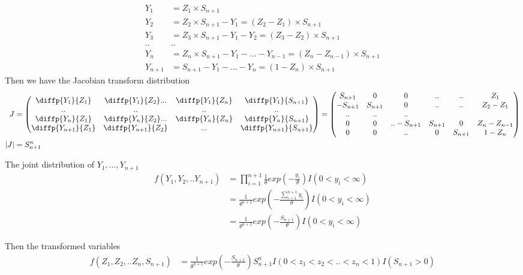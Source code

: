 \documentclass[11pt]{article} %
\begin{document}
\begin{align*}
	Y_1 &= Z_1 \times S_{n+1} \\
	Y_2 &= Z_2 \times S_{n+1} - Y_1 = (Z_2  - Z_1) \times S_{n+1}\\
	Y_3 &= Z_3 \times S_{n+1} - Y_1 - Y_2 = (Z_3  - Z_2) \times S_{n+1}\\
	.. & ..\\
	Y_n &= Z_n \times S_{n+1} - Y_1 - ...- Y_{n-1} = (Z_n  - Z_{n-1}) \times S_{n+1}\\
	Y_{n+1} &= S_{n+1} - Y_1 - ...- Y_{n} = (1- Z_n)  \times S_{n+1}
\end{align*}
Then we have the Jacobian transform distribution
\begin{align*}
	J &= \begin{pmatrix}
		\diffp{Y_1}{{Z_1}} & \diffp{Y_1}{{Z_2}} ... & \diffp{Y_1}{{Z_n}} & \diffp{Y_1}{{S_{n+1}}}\\
		..& ..& ..& ..\\
		\diffp{Y_n}{{Z_1}} & \diffp{Y_n}{{Z_2}}  ... & \diffp{Y_n}{{Z_n}} & \diffp{Y_n}{{S_{n+1}}}\\
		\diffp{Y_{n+1}}{{Z_1}} & \diffp{Y_{n+1}}{{Z_2}} & ...& \diffp{Y_{n+1}}{{S_{n+1}}}
	\end{pmatrix} =  \begin{pmatrix}
		S_{n+1} & 0 & 0 &.. & ..& Z_1  \\
		-S_{n+1} & S_{n+1} & 0 &.. &..& Z_2- Z_1  \\
		.. & .. & .. \\
		0 & 0&.. -S_{n+1} & S_{n+1}  &0 & Z_{n}- Z_{n-1}  \\
		0 & 0 &..& 0 & S_{n+1}& 1- Z_n\\
	\end{pmatrix}\\
	|J| &= S_{n+1}^{n}
\end{align*}

The joint distribution of $Y_1, ..., Y_{n+1}$
\begin{align*}
	f(Y_1, Y_2,.. Y_{n+1}) &= \prod_{i=1}^{n+1} \frac{1}{\theta} exp(-\frac{y_i}{\theta}) I(0< y_i < \infty) \\
	&= \frac{1}{\theta^{n+1}} exp(-\frac{\sum_{i=1}^{n+1} y_i}{\theta}) I(0< y_i < \infty)\\
	&= \frac{1}{\theta^{n+1}} exp(-\frac{S_{n+1}}{\theta}) I(0< y_i < \infty)
\end{align*}

Then the transformed variables
\begin{align*}
	f(Z_1, Z_2,.. Z_{n}, S_{n+1}) &= \frac{1}{\theta^{n+1}} exp(-\frac{S_{n+1}}{\theta}) S_{n+1}^{n} I(0< z_1 < z_2 <.. <z_n < 1) I(S_{n+1} > 0)
\end{align*}
\end{document}
